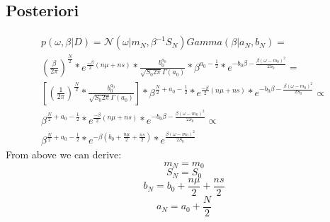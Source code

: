 \documentclass{article}
\begin{document}
\subsection{Posteriori}
\begin{multline}
    p(\omega, \beta | D) =  \mathcal{N}(\omega|m_N, \beta^{-1}S_N)Gamma(\beta|a_N,b_N) = \\
    (\frac{\beta}{2\pi})^{\frac{N}{2}} * e^{\frac{-\beta}{2} (n\mu + ns)} * \frac{b_0^{a_0}}{\sqrt{S_0 2\pi} \Gamma(a_0)} * \beta^{a_0 - \frac{1}{2}} * e ^{-b_0\beta - \frac{\beta(\omega-m_0)^2}{2S_0}} =\\
    [(\frac{1}{2\pi})^{\frac{N}{2}} * \frac{b_0^{a_0}}{\sqrt{S_0 2\pi} \Gamma(a_0)}] * \beta^{\frac{N}{2} + a_0 - \frac{1}{2}} *  e^{\frac{-\beta}{2} (n\mu + ns)} * e ^{-b_0\beta - \frac{\beta(\omega-m_0)^2}{2S_0}} \propto \\
    \beta^{\frac{N}{2} + a_0 - \frac{1}{2}} *  e^{\frac{-\beta}{2} (n\mu + ns)} * e ^{-b_0\beta - \frac{\beta(\omega-m_0)^2}{2S_0}} \propto \\
    \beta^{\frac{N}{2} + a_0 - \frac{1}{2}} *  e^{-\beta(b_0 + \frac{n\mu}{2} + \frac{ns}{2})} * e ^{\frac{\beta(\omega-m_0)^2}{2S_0}}
\end{multline}
From above we can derive:
\begin{equation}
    m_N = m_0
\end{equation}
\begin{equation}
    S_N = S_0
\end{equation}
\begin{equation}
    b_N = b_0 + \frac{n\mu}{2} + \frac{ns}{2}
\end{equation}
\begin{equation}
    a_N = a_0 + \frac{N}{2}
\end{equation}
\end{document}
